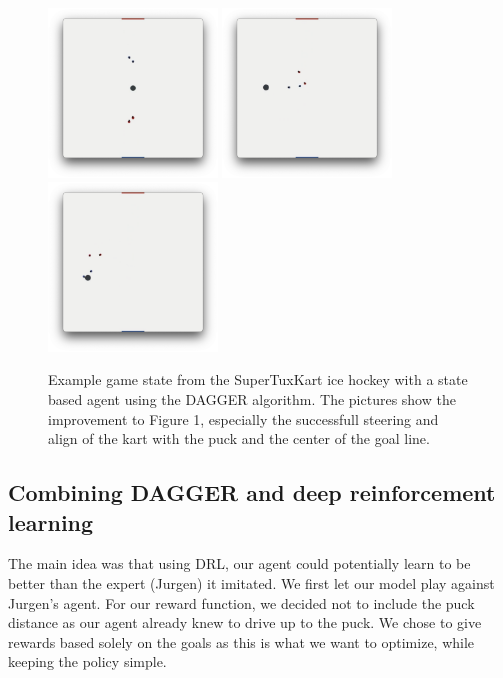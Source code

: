 \documentclass[10pt,twocolumn,letterpaper]{article}
\begin{document}
\begin{figure}
  \centering
  \includegraphics[width=0.4\textwidth]{figures/dagger_good.png}
  \includegraphics[width=0.4\textwidth]{figures/dagger_good3.png}
  \includegraphics[width=0.4\textwidth]{figures/dagger_good2.png}
  \caption{Example game state from the SuperTuxKart ice hockey with a state based agent using the DAGGER algorithm. The pictures show the improvement to Figure 1, especially the successfull steering and align of the kart with the puck and the center of the goal line.}
\end{figure}

\subsection{Combining DAGGER and deep reinforcement learning}

The main idea was that using DRL, our agent could potentially learn to be better than the expert (Jurgen) it imitated. We first let our model play against Jurgen’s agent. For our reward function, we decided not to include the puck distance as our agent already knew to drive up to the puck. We chose to give rewards based solely on the goals as this is what we want to optimize, while keeping the policy simple.
\end{document}
